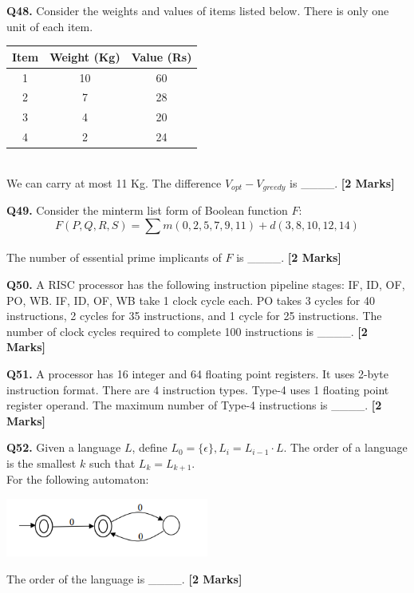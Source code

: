 \documentclass[11pt]{article}
\newcommand{\questionb}[2]{
    \noindent\textbf{Q#2.} #1 \hfill \textbf{[2 Marks]}
}
\begin{document}
\questionb{Consider the weights and values of items listed below. There is only one unit of each item.\\
\begin{tabular}{|c|c|c|}
\hline
Item & Weight (Kg) & Value (Rs) \\\hline
1 & 10 & 60 \\\hline
2 & 7  & 28 \\\hline
3 & 4  & 20 \\\hline
4 & 2  & 24 \\\hline
\end{tabular}\\
We can carry at most 11 Kg. The difference \( V_{opt} - V_{greedy} \) is \_\_\_\_.}{48}
\vspace{0.5cm}

\questionb{Consider the minterm list form of Boolean function \( F \):\\
\[
F(P, Q, R, S) = \sum m(0, 2, 5, 7, 9, 11) + d(3, 8, 10, 12, 14)
\]\\
The number of essential prime implicants of \( F \) is \_\_\_\_.}{49}
\vspace{0.5cm}

\questionb{A RISC processor has the following instruction pipeline stages: IF, ID, OF, PO, WB. IF, ID, OF, WB take 1 clock cycle each. PO takes 3 cycles for 40 instructions, 2 cycles for 35 instructions, and 1 cycle for 25 instructions. The number of clock cycles required to complete 100 instructions is \_\_\_\_.}{50}
\vspace{0.5cm}

\questionb{A processor has 16 integer and 64 floating point registers. It uses 2-byte instruction format. There are 4 instruction types. Type-4 uses 1 floating point register operand. The maximum number of Type-4 instructions is \_\_\_\_.}{51}
\vspace{0.5cm}

\questionb{Given a language \( L \), define \( L_0 = \{\epsilon\}, L_i = L_{i-1} \cdot L \). The order of a language is the smallest \( k \) such that \( L_k = L_{k+1} \).\\
For the following automaton:
\begin{center}
\includegraphics[width=0.5\textwidth]{figures/52}
\end{center}
The order of the language is \_\_\_\_.}{52}
\vspace{0.5cm}
\end{document}
